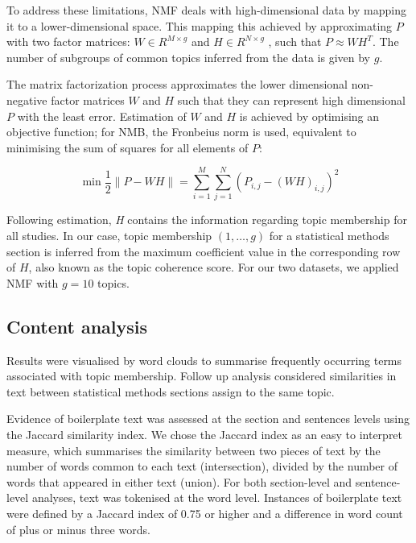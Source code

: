 \documentclass[12pt]{article}
\begin{document}
To address these limitations, NMF deals with high-dimensional data by
mapping it to a lower-dimensional space. This mapping this achieved by
approximating \(P\) with two factor matrices: \(W \in R^{M \times g}\)
and \(H \in R ^{N \times g}\) \citep{aggarwal2012mining}, such that
\(P \approx WH^{T}\). The number of subgroups of common topics inferred
from the data is given by \(g\).

The matrix factorization process approximates the lower dimensional
non-negative factor matrices \(W\) and \(H\) such that they can
represent high dimensional \(P\) with the least error. Estimation of
\(W\) and \(H\) is achieved by optimising an objective function; for
NMB, the Fronbeius norm is used, equivalent to minimising the sum of
squares for all elements of \(P\):

\begin{equation}
\label{eq:NMFobjectivefn}
\min \frac{1}{2}\|P - WH\|= \sum _{i=1}^{M}\sum _{j=1}^{N} \left(  P_{i,j} -\left(WH \right)_{i,j} \right)^{2}
\end{equation}

Following estimation, \textit{H} contains the information regarding
topic membership for all studies. In our case, topic membership
\((1,\ldots,g)\) for a statistical methods section is inferred from the
maximum coefficient value in the corresponding row of \(H\), also known
as the topic coherence score. For our two datasets, we applied NMF with
\(g=10\) topics.

\subsection{Content analysis}

Results were visualised by word clouds to summarise
frequently occurring terms associated with topic membership. Follow up analysis considered 
similarities in text between statistical methods sections assign to the same topic.

Evidence of boilerplate text was assessed at the section and sentences levels using the Jaccard similarity index. 
We chose the Jaccard index as an easy to interpret measure, which summarises the similarity between two pieces of text by the
number of words common to each text (intersection), divided by the
number of words that appeared in either text (union). For both section-level and sentence-level analyses, text was tokenised at the word level. 
Instances of boilerplate text were defined by a Jaccard index of 0.75 or higher and a difference in word count of plus or minus three words.
\end{document}
